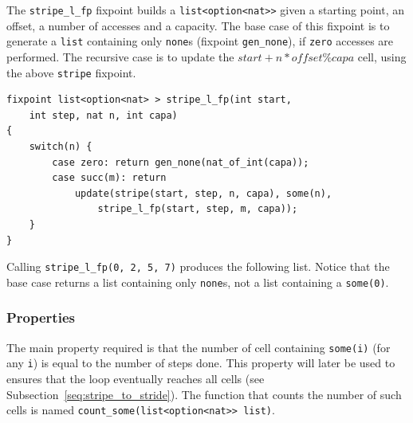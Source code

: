 \documentclass[oneside]{article}
\begin{document}
The \texttt{stripe\_l\_fp} fixpoint builds a \texttt{list<option<nat>>} given a starting point, an offset, a number of accesses and a capacity. The base case of this fixpoint is to generate a \texttt{list} containing only \texttt{none}s (fixpoint \texttt{gen\_none}), if \texttt{zero} accesses are performed. The recursive case is to update the $start + n*offset \%capa$ cell, using the above \texttt{stripe} fixpoint. 

\begin{definition}
	\begin{lstlisting}
fixpoint list<option<nat> > stripe_l_fp(int start,
	int step, nat n, int capa)
{
	switch(n) {
		case zero: return gen_none(nat_of_int(capa));
		case succ(m): return 
			update(stripe(start, step, n, capa), some(n), 
				stripe_l_fp(start, step, m, capa));
	}
}
 	\end{lstlisting}
\end{definition}

\begin{example}
	Calling \texttt{stripe\_l\_fp(0, 2, 5, 7)} produces the following list. Notice that the base case returns a list containing only \texttt{none}s, not a list containing a \texttt{some(0)}. 
	\begin{center}
	\end{center}
\end{example}


\subsubsection{Properties}
The main property required is that the number of cell containing \texttt{some(i)} (for any \texttt{i}) is equal to the number of steps done. This property will later be used to ensures that the loop eventually reaches all cells (see Subsection~\ref{seq:stripe_to_stride}). The function that counts the number of such cells is named \texttt{count\_some(list<option<nat>> list)}.
\end{document}
